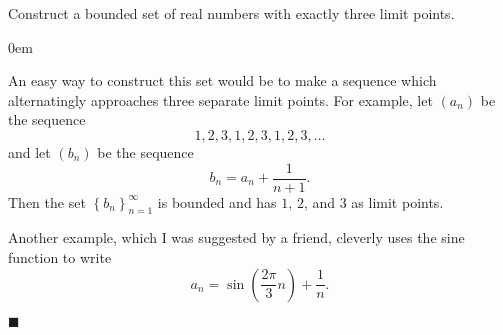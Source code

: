 \documentclass[12pt]{article}
\renewcommand{\qed}{\hfill$\blacksquare$}
\renewenvironment{proof}{\begin{addmargin}[1em]{0em}\begin{newproof}}{\end{newproof}\end{addmargin}\qed}
\newenvironment{problem}[2][Exercise]{\begin{trivlist}
\item[\hskip \labelsep {\bfseries #1}\hskip \labelsep {\bfseries #2.}]}{\end{trivlist}}
\begin{document}
\begin{problem}{2.5}
Construct a bounded set of real numbers with exactly three limit points.
\end{problem}
\begin{proof}
An easy way to construct this set would be to make a sequence which alternatingly approaches three separate limit points. For example, let $\left(a_n\right)$ be the sequence $$ 1,2,3,1,2,3,1,2,3,\ldots $$ and let $\left(b_n\right)$ be the sequence $$ b_n = a_n + \frac{1}{n+1}. $$ Then the set $\left\{b_n\right\}_{n=1}^{\infty}$ is bounded and has $1$, $2$, and $3$ as limit points.

Another example, which I was suggested by a friend, cleverly uses the sine function to write $$ a_n = \sin \left(\frac{2\pi}{3} n\right) + \frac{1}{n}. $$
\end{proof}
\end{document}
